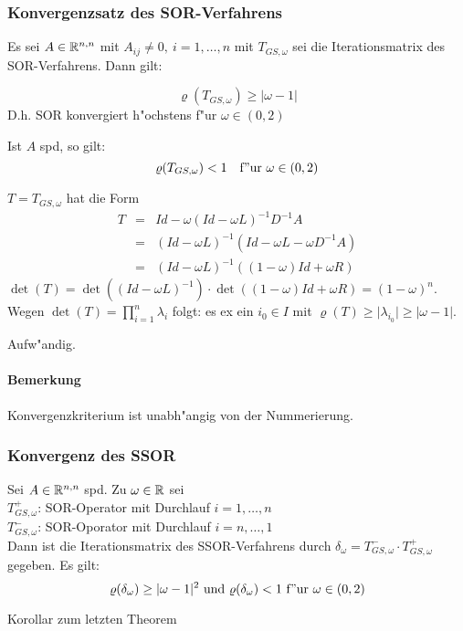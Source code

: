 \documentclass{scrartcl}
\begin{document}
\subsubsection{Konvergenzsatz des SOR-Verfahrens}

\begin{Satz}
Es sei $A \in \mathbb{R}^{n,n}$ mit $A_{ij} \neq 0, \ i=1, \ldots, n$ mit $T_{GS,\omega}$ sei die Iterationsmatrix des SOR-Verfahrens. Dann gilt:
\begin{1aufz}
\item $$\varrho(T_{GS, \omega}) \geq \vert \omega - 1 \vert$$D.h. SOR konvergiert h"ochstens f"ur $\omega \in (0,2)$
\item Ist $A$ spd, so gilt:
$$\varrho(T_{GS, \omega}) < 1 \quad \mathrm{f"ur \ } \omega \in (0,2)$$
\end{1aufz}
\end{Satz}
\begin{Bew}
\begin{1aufz}
\item $T = T_{GS, \omega}$ hat die Form
\begin{eqnarray*}
T & = & Id - \omega(Id - \omega L)^{-1}D^{-1}A \\
& = & (Id - \omega L)^{-1}(Id - \omega L - \omega D^{-1} A) \\
& = & (Id - \omega L)^{-1}((1- \omega) Id + \omega R)
\end{eqnarray*}
$\det(T) = \det((Id - \omega L)^{-1})\cdot \det((1 - \omega) Id + \omega R) = (1- \omega)^n$. \\ Wegen $\det(T) = \prod\limits_{i=1}^n \lambda_i$ folgt: es ex ein $i_0 \in I$ mit $\varrho(T) \geq \vert \lambda_{i_0} \vert \geq \vert \omega - 1\vert$.
\item Aufw"andig.
\end{1aufz}
\end{Bew}

\paragraph{Bemerkung}
Konvergenzkriterium ist unabh"angig von der Nummerierung.

\subsubsection{Konvergenz des SSOR}

\begin{Satz}
Sei $A \in \mathbb{R}^{n,n}$ spd. Zu $\omega \in \mathbb{R}$ sei \\
$T_{GS, \omega}^+$: SOR-Operator mit Durchlauf $i=1, \ldots, n$ \\
$T_{GS, \omega}^-$: SOR-Oporator mit Durchlauf $i=n, \ldots, 1$ \\
Dann ist die Iterationsmatrix des SSOR-Verfahrens durch $\delta_\omega = T_{GS, \omega}^- \cdot T_{GS, \omega}^+$ gegeben. Es gilt:
$$ \varrho(\delta_\omega) \geq \vert \omega - 1 \vert^2 \mathrm{\ und \ } \varrho(\delta_\omega) < 1 \mathrm{ \ f"ur \ } \omega \in (0,2)$$
\end{Satz}
\begin{Bew}
Korollar zum letzten Theorem
\end{Bew}
\end{document}
